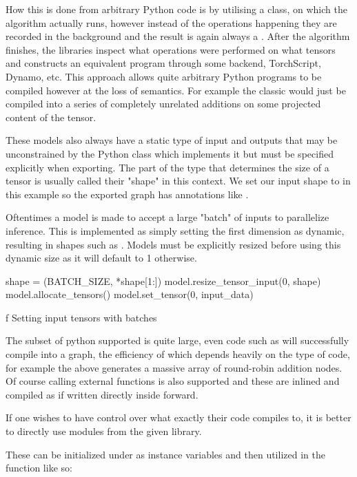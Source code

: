 How this is done from arbitrary Python code is by utilising
a  class,
on which the algorithm actually runs,
however instead of the operations
happening they are recorded in the background
and the result is again always a .
After the algorithm finishes,
the libraries inspect what operations were performed
on what tensors and constructs an equivalent program
through some backend, TorchScript, Dynamo, etc.
This approach allows quite arbitrary Python programs
to be compiled however at the loss of semantics.
For example the classic 
would just be compiled into a series of completely unrelated
additions on some projected content of the tensor.

These models also always have a static type of input and outputs
that may be unconstrained by the Python class which implements it
but must be specified explicitly when exporting.
The part of the type that determines the size of a tensor
is usually called their "shape" in this context.
We set our input shape to  in this example
so the exported graph has annotations like .

Oftentimes a model is made to accept a large "batch" of inputs
to parallelize inference.
This is implemented as simply
setting the first dimension as dynamic,
resulting in shapes such as .
Models must be explicitly resized before using this dynamic size
as it will default to 1 otherwise.

\midinsert
\begtt {}
shape = (BATCH_SIZE, *shape[1:])
model.resize_tensor_input(0, shape)
model.allocate_tensors()
model.set_tensor(0, input_data)
\endtt
\caption/f Setting input tensors with batches
\endinsert

The subset of python supported is quite large,
even code such as 
will successfully compile into a graph,
the efficiency of which depends heavily on
the type of code,
for example the above generates a massive
array of round-robin addition nodes.
Of course calling external functions is also supported
and these are inlined and compiled as if written
directly inside forward.

If one wishes to have control over what
exactly their code compiles to,
it is better to directly use modules from the given library.

These can be initialized under 
as instance variables and then utilized in
the  function like so:

